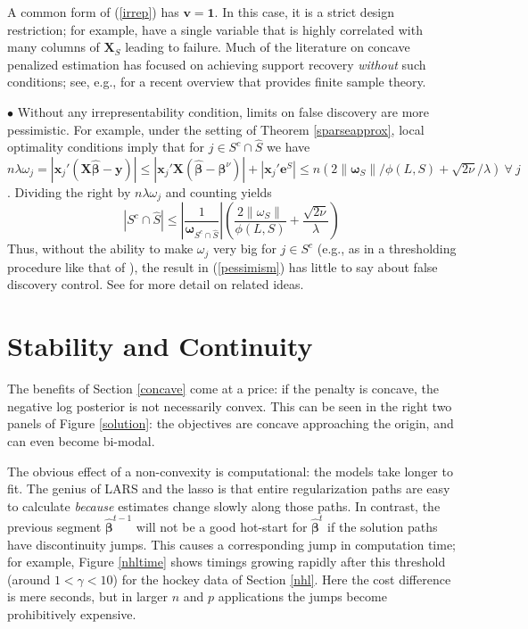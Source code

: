 \documentclass[12pt]{article}
\newcommand{\bs}[1]{\boldsymbol{#1}}
\newcommand{\bm}[1]{\mathbf{#1}}
\begin{document}
A common form of (\ref{irrep}) has $\bm{v}=\bm{1}$.  In this case, it
is a strict design restriction; for example,
\citet{buhlmann_statistics_2011} have a single variable that is
highly correlated with many columns of $\bm{X}_S$ leading to failure. Much
of the literature on concave penalized estimation has focused on achieving
support recovery {\it without} such conditions; see, e.g.,
\cite{fan_strong_2014} for a recent overview that provides finite sample
theory.  




\noindent $\bullet$ Without any irrepresentability condition,  limits on false discovery are more pessimistic.  For example, under the setting of Theorem \ref{sparseapprox},  local optimality
conditions imply that for $j \in S^c \cap \hat S$ we have
$n\lambda \omega_j = |\bs{x}_j'(\bm{X}\bs{\hat\beta}-\bm{y})| \leq
|\bs{x}_j'\bm{X}(\bs{\hat\beta}-\bs{\beta}^\nu)| + |\bs{x}_j'\bm{e}^S| \leq
n\left(2\|\bs{\omega}_S\|/\phi(L,S) + \sqrt{2\nu}/\lambda\right) ~\forall~j$. 
Dividing the right by $n\lambda\omega_j$ and counting yields
\begin{equation}\label{pessimism}
|S^c \cap \hat S| \leq \left|\frac{1}{\bs{\omega}_{S^c \cap \hat S}}\right|
\left(\frac{2\|\omega_S\|}{\phi(L,S)} + \frac{\sqrt{2\nu}}{\lambda}\right)
\end{equation}
Thus, without the ability to
make $\omega_j$ very big for $j \in S^c$ (e.g., as in a thresholding procedure
like that of \citealt{zhou_thresholding_2009}), the result in (\ref{pessimism}) has little to say about false discovery control.
See 
\cite{buhlmann_statistics_2011} for more detail on related ideas.


\section{Stability and Continuity}
\label{stability}


The benefits of Section \ref{concave} come at a price: if the penalty is
concave, the negative log posterior is not necessarily convex.  This can
be seen in the right two panels of Figure \ref{solution}: the objectives are
concave approaching the origin, and can even become bi-modal.

The obvious effect of a non-convexity is computational:  the models take
longer to fit. The genius of LARS and the lasso is that entire regularization
paths are easy to calculate {\it because}  estimates change slowly along those
paths.  In contrast, the previous segment $\bs{\hat\beta}^{t-1}$ will not be a
good hot-start for $\bs{\hat\beta}^{t}$ if the solution paths have
discontinuity jumps. This causes a corresponding jump in computation time; for
example, Figure \ref{nhltime} shows timings growing rapidly after
 this threshold (around $1<\gamma<10$) for the hockey data  of Section \ref{nhl}.
Here the cost difference is mere seconds, but in larger $n$ and $p$
applications the jumps become prohibitively expensive.
\end{document}
